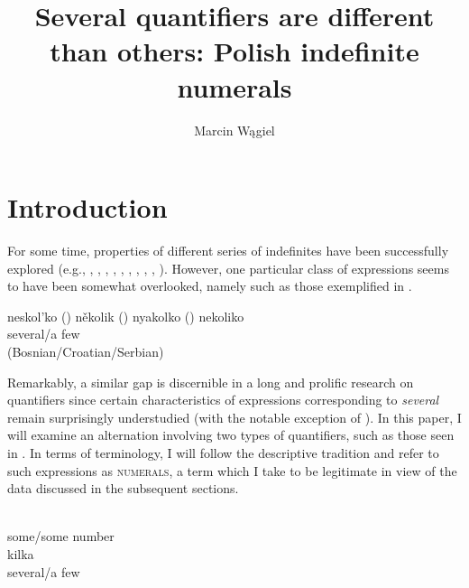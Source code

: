 \documentclass[output=paper, newtxmath, colorlinks, citecolor=brown]{langsci/langscibook}
\title{Several quantifiers are different than others: Polish indefinite numerals}
\author{Marcin Wągiel\affiliation{Masaryk University in Brno}}
\begin{document}
	\maketitle
	\section{Introduction}\label{introduction}

	For some time, properties of different series of  indefinites have been successfully explored (e.g., \citealt{blaszczak2001investigation}, \citealt{testelets_bylinina2005sluicing}, \citealt{yanovich2005choice}, \citealt{geist2008specificity}, \citealt{pereltsvaig2008russian}, \citealt{eremina2012semantics}, \citealt{docekal_strachonova2015freedom}, \citealt{richtarcikova2015epistemic}, \citealt{simik2015epistemic}, \citealt{strachonova2016ceska}). However, one particular class of  expressions seems to have been somewhat overlooked, namely  such as those exemplified in .

	\ea \label{ex:slavic-indefinite-quantifiers} \ea neskol'ko \hfill ()
	\ex několik \hfill ()
	\ex nyakolko \hfill ()
	\ex \gll nekoliko\\
	several/a few\\ \hfill ({Bosnian/Croatian/Serbian})
    \z
    \z

	\noindent Remarkably, a similar gap is discernible in a long and prolific research on quantifiers since certain characteristics of expressions corresponding to  \textit{several} remain surprisingly understudied (with the notable exception of \citealt{kayne2007several}). In this paper, I will examine an alternation involving two types of   quantifiers, such as those seen in . In terms of terminology, I will follow the  descriptive tradition and refer to such expressions as \textsc{ numerals}, a term which I take to be legitimate in view of the data discussed in the subsequent sections.

	\ea \label{ex:polish-indefinite-quantifiers} \ea \gll {}\\
	some/some number\\
	\ex \gll kilka\\
	several/a few\\
    \z
    \z
\end{document}
